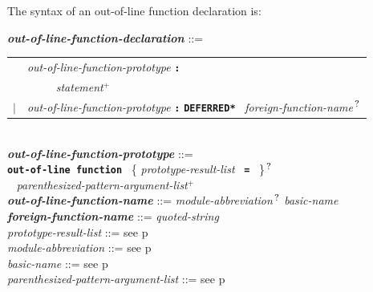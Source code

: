 \documentclass[12pt]{article}
\newcommand{\TT}[1]{{\tt \bfseries #1}}
\newcommand{\PLUS}[1][]{{$^{+#1}$}}
\newcommand{\QMARK}{{$^{\,\mbox{\footnotesize ?}}$}}
\newcommand{\ttkey}[1]{{\tt \bfseries #1}}
\newcommand{\emkey}[1]{{\em \bfseries #1}}
\newcommand{\pagref}[1]{p\pageref{#1}}
\newenvironment{indpar}[1][0.3in]%
	{\begin{list}{}%
		     {\setlength{\itemsep}{0in}%
		      \setlength{\topsep}{0in}%
		      \setlength{\parsep}{1ex}%
		      \setlength{\labelwidth}{#1}%
		      \setlength{\leftmargin}{#1}%
		      \addtolength{\leftmargin}{\labelsep}}%
	 \item}%
	{\end{list}}
\begin{document}
The syntax of an out-of-line function declaration is:

\begin{indpar}
\emkey{out-of-line-function-declaration}%
	\label{OUT-OF-LINE-FUNCTION-DECLARATION} ::= \\
\hspace*{0.5in}
    \begin{tabular}[t]{rl}
        &  {\em out-of-line-function-prototype} \TT{:} \\
	& \TT{~~~~~}{\em statement}\PLUS{} \\
    $|$ &  {\em out-of-line-function-prototype} \TT{:}
    		\ttkey{*DEFERRED*}~ {\em foreign-function-name}\QMARK{} \\
    \end{tabular}
\\[2ex]
\emkey{out-of-line-function-prototype}%
	\label{OUT-OF-LINE-FUNCTION-PROTOTYPE} ::= \\
\hspace*{0.25in} \ttkey{out-of-line function}~
          \{ {\em prototype-result-list}~ \TT{=}~ \}\QMARK{} \\
\hspace*{0.5in}{\em out-of-line-function-name}~
	      {\em parenthesized-pattern-argument-list}\PLUS{}
\\[0.5ex]
\emkey{out-of-line-function-name} ::=
    {\em module-abbreviation}\QMARK{} {\em basic-name}
\\[0.5ex]
\emkey{foreign-function-name}\label{FOREIGN-FUNCTION-NAME}
	::= {\em quoted-string}
\\[0.5ex]
{\em prototype-result-list} ::= see \pagref{PROTOTYPE-RESULT-LIST}
\\[0.5ex]
{\em module-abbreviation} ::= see \pagref{MODULE-ABBREVIATION}
\\[0.5ex]
{\em basic-name} ::= see \pagref{BASIC-NAME}
\\[0.5ex]
{\em parenthesized-pattern-argument-list} ::=
    see \pagref{PARENTHESIZED-PATTERN-ARGUMENT-LIST}


\end{indpar}
\end{document}
